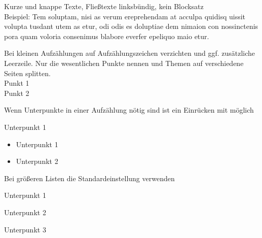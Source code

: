 \begin{frame}
\begin{frame}
\end{frame}
\clearpage


\begin{frame}
 
Kurze und knappe Texte, Fließtexte linksbündig, kein Blocksatz \\[\baselineskip]

Beispiel:\newline
Tem soluptam, nisi as verum ereprehendam at acculpa quidisq uissit volupta
tusdant utem as etur, odi odis es doluptiae dem nimaion con nossinctenis pora
quam voloria consenimus blabore everfer epeliquo maio etur.

\end{frame}
\clearpage

\begin{frame}
    
Bei kleinen Aufzählungen auf Aufzählungszeichen verzichten und ggf. zusätzliche Leerzeile.\newline
Nur die wesentlichen Punkte nennen und Themen auf verschiedene Seiten splitten.\\
Punkt 1\\
Punkt 2

Wenn Unterpunkte in einer Aufzählung nötig sind ist ein Einrücken mit \PraesentationAufzaehlungEbeneZweiSymbol{} möglich

\begin{PraesentationAufzaehlung}
    \item Unterpunkt 1
        \begin{itemize}
            \item Unterpunkt 1
            \item Unterpunkt 2
        \end{itemize}
\end{PraesentationAufzaehlung}

Bei größeren Listen die Standardeinstellung \PraesentationAufzaehlungEbeneEinsSymbol{} verwenden

\begin{PraesentationAufzaehlung}
    \item Unterpunkt 1
    \item Unterpunkt 2
    \item Unterpunkt 3
\end{PraesentationAufzaehlung}


\end{frame}
\end{frame}
